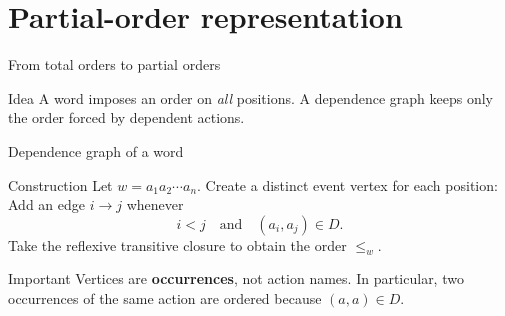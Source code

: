\documentclass[t,11pt]{beamer}
\begin{document}
\section{Partial-order representation}

\begin{frame}{From total orders to partial orders}
  \begin{center}
  \end{center}
  \begin{block}{Idea}
    A word imposes an order on \emph{all} positions. A dependence graph keeps only the order forced by dependent actions.
  \end{block}
\end{frame}

\begin{frame}{Dependence graph of a word}
  \begin{block}{Construction}
    Let $w=a_1a_2\cdots a_n$. Create a distinct event vertex for each position:
    Add an edge $i\to j$ whenever
    \[
       i<j\quad\text{and}\quad (a_i,a_j)\in D.
    \]
    Take the reflexive transitive closure to obtain the order $\leq_w$.
  \end{block}
  \begin{block}{Important}
    Vertices are \textbf{occurrences}, not action names. In particular, two occurrences of the same action are ordered because $(a,a)\in D$.
  \end{block}
\end{frame}
\end{document}

